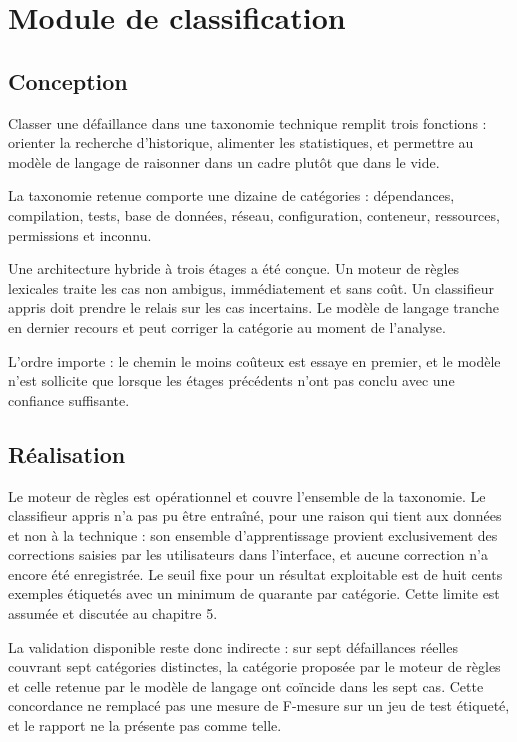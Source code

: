 \documentclass[12pt,a4paper,oneside]{report}
\begin{document}
\section{Module de classification}

\subsection{Conception}

Classer une défaillance dans une taxonomie technique remplit trois fonctions :
orienter la recherche d'historique, alimenter les statistiques, et permettre au
modèle de langage de raisonner dans un cadre plutôt que dans le vide.

La taxonomie retenue comporte une dizaine de catégories : dépendances,
compilation, tests, base de données, réseau, configuration, conteneur,
ressources, permissions et inconnu.

Une architecture hybride à trois étages a été conçue. Un moteur de règles
lexicales traite les cas non ambigus, immédiatement et sans coût. Un classifieur
appris doit prendre le relais sur les cas incertains. Le modèle de langage
tranche en dernier recours et peut corriger la catégorie au moment de l'analyse.

L'ordre importe : le chemin le moins coûteux est essaye en premier, et le modèle
n'est sollicite que lorsque les étages précédents n'ont pas conclu avec une
confiance suffisante.

\subsection{Réalisation}

Le moteur de règles est opérationnel et couvre l'ensemble de la taxonomie. Le
classifieur appris n'a pas pu être entraîné, pour une raison qui tient aux
données et non à la technique : son ensemble d'apprentissage provient
exclusivement des corrections saisies par les utilisateurs dans l'interface, et
aucune correction n'a encore été enregistrée. Le seuil fixe pour un résultat
exploitable est de huit cents exemples étiquetés avec un minimum de quarante par
catégorie. Cette limite est assumée et discutée au chapitre 5.

La validation disponible reste donc indirecte : sur sept défaillances réelles
couvrant sept catégories distinctes, la catégorie proposée par le moteur de
règles et celle retenue par le modèle de langage ont coïncide dans les sept cas.
Cette concordance ne remplacé pas une mesure de F-mesure sur un jeu de test
étiqueté, et le rapport ne la présente pas comme telle.
\end{document}
